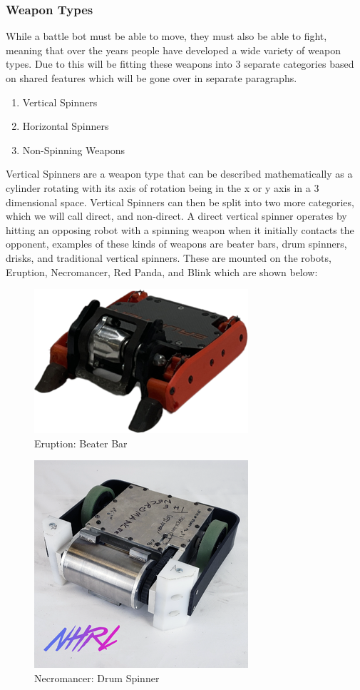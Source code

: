 \documentclass[conference]{IEEEtran}
\begin{document}
\subsubsection{Weapon Types}

While a battle bot must be able to move, they must also be able to fight, meaning that over the years people have developed a wide variety of weapon types.  Due to this will be fitting these weapons into 3 separate categories based on shared features which will be gone over in separate paragraphs.
\begin{enumerate}
\item{Vertical Spinners}
\item{Horizontal Spinners}
\item{Non-Spinning Weapons}
\end{enumerate}

Vertical Spinners are a weapon type that can be described mathematically as a cylinder rotating with its axis of rotation being in the x or y axis in a 3 dimensional space.  Vertical Spinners can then be split into two more categories, which we will call direct, and non-direct.  A direct vertical spinner operates by hitting an opposing robot with a spinning weapon when it initially contacts the opponent, examples of these kinds of weapons are beater bars, drum spinners, drisks, and traditional vertical spinners.  These are mounted on the robots, Eruption, Necromancer, Red Panda, and Blink which are shown below:

\begin{figure}[htp]
\centering
\includegraphics[scale=0.4]{eruption.png}
\caption{Eruption: Beater Bar \cite{b2}}
\label{Eruption: Beater Bar}
\end{figure}

\begin{figure}[htp]
\centering
\includegraphics[scale=0.4]{necromancer.png}
\caption{Necromancer: Drum Spinner \cite{b2}}
\label{Necromancer: Drum Spinner}
\end{figure}
\end{document}
